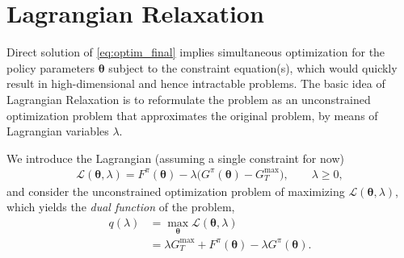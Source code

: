 \documentclass{article}
\begin{document}
\section{Lagrangian Relaxation}
Direct solution of \eqref{eq:optim_final} implies simultaneous optimization for the policy parameters $\boldsymbol{\theta}$ subject to the constraint equation(s), which would quickly result in high-dimensional and hence intractable problems. The basic idea of Lagrangian Relaxation is to reformulate the problem as an unconstrained optimization problem that approximates the original problem, by means of Lagrangian variables $\lambda$.

We introduce the Lagrangian (assuming a single constraint for now)
\begin{align}
    \mathcal{L}(\boldsymbol{\theta}, \lambda) = F^\pi(\boldsymbol{\theta}) -\lambda \bigl(G^\pi(\boldsymbol{\theta})-G_T^{\max}\bigr),\qquad
    \lambda \ge 0,\label{eq:lagrangian}
\end{align}
and consider the unconstrained optimization problem of maximizing $\mathcal{L}(\boldsymbol{\theta}, \lambda)$, which yields the \textit{dual function} of the problem,
\begin{align}
    q(\lambda) &=\max_{\boldsymbol{\theta}}
    \mathcal{L}(\boldsymbol{\theta},\lambda)\\
    &=\lambda G_T^{\max} + F^\pi(\boldsymbol{\theta}) - \lambda G^\pi(\boldsymbol{\theta}).
\end{align}

\end{document}
